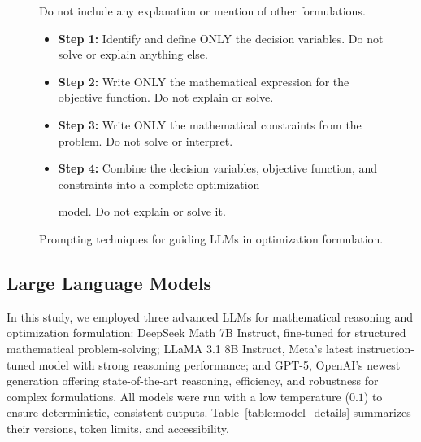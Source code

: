 \documentclass[review,12pt]{elsarticle}
\begin{document}
\begin{figure}[htbp]
{{\begin{tcolorbox}
{\begin{tcolorbox}[colframe=purple!50!black, colback=purple!10, title=\textbf{Prompt 5: Self-Consistency}, boxrule=0.3pt, arc=1pt, top=0pt, bottom=0pt]
Do not include any explanation or mention of other formulations.
\end{tcolorbox}

\begin{tcolorbox}[colframe=purple!50!black, colback=purple!10, title=\textbf{Prompt 6: Modular Prompting Steps}, boxrule=0.3pt, arc=1pt, top=1pt, bottom=1pt] 
\begin{itemize}
    \item \textbf{Step 1:} Identify and define ONLY the decision variables. Do not solve or explain anything else.
    \vspace{-6mm} 
    \item \textbf{Step 2:} Write ONLY the mathematical expression for the objective function. Do not explain or solve.
    \vspace{-6mm}
    \item \textbf{Step 3:} Write ONLY the mathematical constraints from the problem. Do not solve or interpret.
     \vspace{-6mm}
    \item \textbf{Step 4:} Combine the decision variables, objective function, and constraints into a complete optimization   
    \vspace{-12mm}

    model. Do not explain or solve it.
\end{itemize}
\end{tcolorbox}

} %

\end{tcolorbox}
} %
}
\caption{Prompting techniques for guiding LLMs in optimization formulation.}
\label{fig:prompting_techniques}
\end{figure}



\subsection{Large Language Models}

In this study, we employed three advanced LLMs for mathematical reasoning and optimization formulation: DeepSeek Math 7B Instruct, fine-tuned for structured mathematical problem-solving; LLaMA 3.1 8B Instruct, Meta’s latest instruction-tuned model with strong reasoning performance; and GPT-5, OpenAI’s newest generation offering state-of-the-art reasoning, efficiency, and robustness for complex formulations. All models were run with a low temperature ($0.1$) to ensure deterministic, consistent outputs. Table~\ref{table:model_details} summarizes their versions, token limits, and accessibility.
\end{document}
